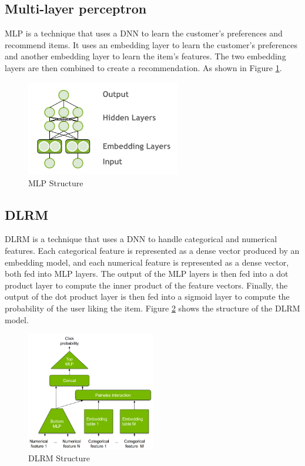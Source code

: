 \subsection{Multi-layer perceptron}
MLP is a technique that uses a DNN to learn the customer's preferences and recommend items. It uses an embedding layer to learn the customer's preferences and another embedding layer to learn the item's features. The two embedding layers are then combined to create a recommendation. As shown in Figure \ref{fig:multi-layer-perceptron}.
\begin{figure}[H]
    \centering
    \includegraphics[width=0.6\textwidth]{assets/mlp.png}
    \caption[MLP Structure]{MLP Structure~\cite{ExploringMerlinModels}}
    \label{fig:multi-layer-perceptron}
\end{figure}

\subsection{DLRM}
DLRM is a technique that uses a DNN to handle categorical and numerical features. 
Each categorical feature is represented as a dense vector produced by an embedding model, 
and each numerical feature is represented as a dense vector, both fed into MLP layers. 
The output of the MLP layers is then fed into a dot product layer to compute the inner product of the feature vectors. 
Finally, the output of the dot product layer is then fed into a sigmoid layer to compute the probability of the user liking the item. Figure \ref{fig:dlrm} shows the structure of the DLRM model.

\begin{figure}[H]
    \centering
    \includegraphics[width=0.5\textwidth]{assets/dlrm.png}
    \caption[DLRM Structure]{DLRM Structure~\cite{NvidiaRecSys}}
    \label{fig:dlrm}
\end{figure}
